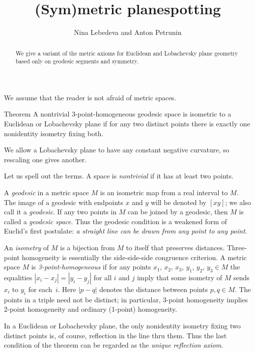 \documentclass[a4paper,10pt]{article}
\def\thetitle{(Sym)metric planespotting}
\def\theauthors{Nina Lebedeva and Anton Petrunin}
\begin{document}
\title{\thetitle}
\author{\theauthors}
\date{}
\maketitle

\begin{abstract}
We give a variant of the metric axioms for Euclidean and Lobachevsky plane geometry based only on geodesic segments and symmetry.
\end{abstract}

We assume that the reader is not afraid of metric spaces.

\begin{thm}{Theorem}\label{thm:main}
A nontrivial 3-point-homogeneous geodesic space is isometric to a Euclidean or Lobachevsky plane
if for any two distinct points there is exactly one nonidentity isometry fixing both.
\end{thm}

We allow a Lobachevsky plane to have any constant negative curvature, so rescaling one gives another.

Let us spell out the terms.
A space is \emph{nontrivial} if it has at least two points.

A \emph{geodesic} in a metric space $M$ is an isometric map from a real interval to $M$.
The image of a geodesic with endpoints $x$ and $y$ will be denoted by $[xy]$; we also call it a \emph{geodesic}.
If any two points in $M$ can be joined by a geodesic, then $M$ is called a \emph{geodesic space}.
Thus the geodesic condition is a weakened form of Euclid's first postulate: \textit{a straight line can be drawn from any point to any point}.

An \emph{isometry} of $M$ is a bijection from $M$ to itself that preserves distances.
Three-point homogeneity is essentially the side-side-side congruence criterion.
A metric space $M$ is \emph{3-point-homogeneous} if for any points $x_1$, $x_2$, $x_3$, $y_1$, $y_2$, $y_3\in M$ the equalities $|x_i-x_j|=|y_i-y_j|$ for all $i$ and $j$ imply that some isometry of $M$ sends $x_i$ to $y_i$ for each~$i$.
Here $|p-q|$ denotes the distance between points $p,q\in M$.
The points in a triple need not be distinct; in particular, 3-point homogeneity implies 2-point homogeneity and ordinary (1-point) homogeneity.

In a Euclidean or Lobachevsky plane, the only nonidentity isometry fixing two distinct points is, of course, reflection in the line thru them.
Thus the last condition of the theorem can be regarded as the \emph{unique reflection axiom}.
\end{document}
